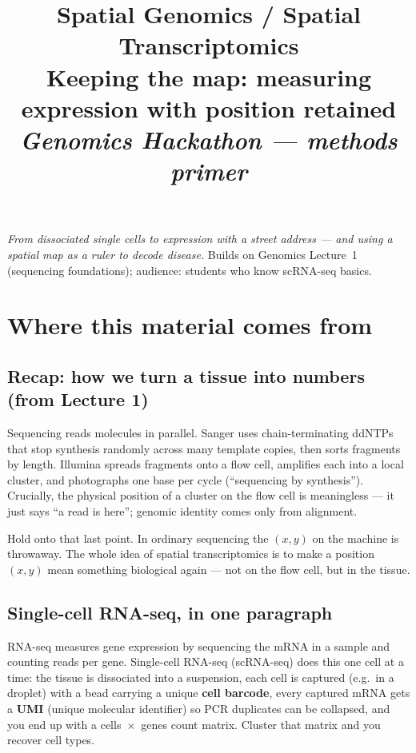 \documentclass[11pt]{article}
\title{\vspace{-2em}\textbf{Spatial Genomics / Spatial Transcriptomics}\\[0.3em]\large Keeping the map: measuring expression with position retained\\[0.6em]\normalsize\textit{Genomics Hackathon --- methods primer}}
\author{}\date{}
\begin{document}
\maketitle
\tableofcontents

\bigskip
{}
\bigskip

\noindent\textit{From dissociated single cells to expression with a street address --- and using a spatial map as a
ruler to decode disease.} Builds on Genomics Lecture~1 (sequencing foundations); audience: students who know
scRNA-seq basics.

\section{Where this material comes from}

\subsection{Recap: how we turn a tissue into numbers (from Lecture 1)}
Sequencing reads molecules in parallel. Sanger uses chain-terminating ddNTPs that stop synthesis randomly across
many template copies, then sorts fragments by length. Illumina spreads fragments onto a flow cell, amplifies each
into a local cluster, and photographs one base per cycle (``sequencing by synthesis''). Crucially, the physical
position of a cluster on the flow cell is meaningless --- it just says ``a read is here''; genomic identity comes
only from alignment.

Hold onto that last point. In ordinary sequencing the $(x,y)$ on the machine is throwaway. The whole idea of
spatial transcriptomics is to make a position $(x,y)$ mean something biological again --- not on the flow cell, but
in the tissue.

\subsection{Single-cell RNA-seq, in one paragraph}
RNA-seq measures gene expression by sequencing the mRNA in a sample and counting reads per gene. Single-cell
RNA-seq (scRNA-seq) does this one cell at a time: the tissue is dissociated into a suspension, each cell is captured
(e.g.\ in a droplet) with a bead carrying a unique \textbf{cell barcode}, every captured mRNA gets a \textbf{UMI}
(unique molecular identifier) so PCR duplicates can be collapsed, and you end up with a cells~$\times$~genes count
matrix. Cluster that matrix and you recover cell types.
\end{document}
